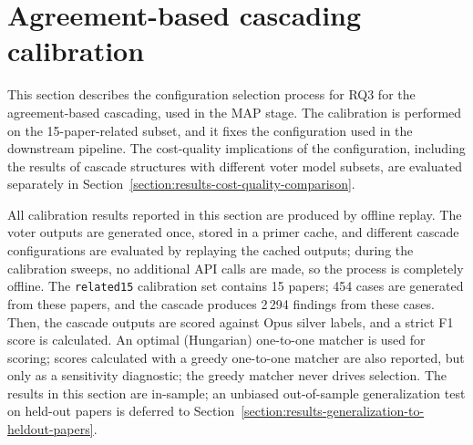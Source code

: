 \section{Agreement-based cascading calibration}\label{section:results-abc-calibration}

This section describes the configuration selection process for RQ3 for the agreement-based cascading, used in the MAP stage. The calibration is performed on the 15-paper-related subset, and it fixes the configuration used in the downstream pipeline. The cost-quality implications of the configuration, including the results of cascade structures with different voter model subsets, are evaluated separately in Section~\ref{section:results-cost-quality-comparison}.

All calibration results reported in this section are produced by offline replay. The voter outputs are generated once, stored in a primer cache, and different cascade configurations are evaluated by replaying the cached outputs; during the calibration sweeps, no additional API calls are made, so the process is completely offline. The \texttt{related15} calibration set contains 15 papers; 454 cases are generated from these papers, and the cascade produces 2\,294 findings from these cases. Then, the cascade outputs are scored against Opus silver labels, and a strict F1 score is calculated. An optimal (Hungarian) one-to-one matcher is used for scoring; scores calculated with a greedy one-to-one matcher are also reported, but only as a sensitivity diagnostic; the greedy matcher never drives selection. The results in this section are in-sample; an unbiased out-of-sample generalization test on held-out papers is deferred to Section~\ref{section:results-generalization-to-heldout-papers}.

